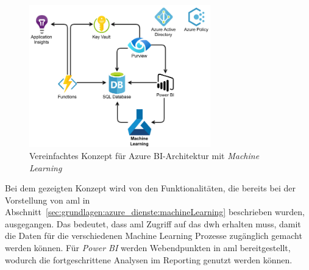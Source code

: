\begin{figure}[htbp]
 \centering
 \includegraphics[width=0.7\textwidth]{gfx/azure/aml.pdf}
 \caption[Vereinfachtes Konzept für Azure BI-Architektur mit Machine Learning]{Vereinfachtes Konzept für Azure BI-Architektur mit \textit{Machine Learning}}
\label{fig:praktischeUmsetzung:ausblick:aml}
\end{figure}

Bei dem gezeigten Konzept wird von den Funktionalitäten, die bereits bei der Vorstellung von \ac{aml} in Abschnitt~\ref{sec:grundlagen:azure_dienste:machineLearning} beschrieben wurden, ausgegangen. Das bedeutet, dass \ac{aml} Zugriff auf das \ac{dwh} erhalten muss, damit die Daten für die verschiedenen Machine Learning Prozesse zugänglich gemacht werden können. Für \textit{Power BI} werden Webendpunkten in \ac{aml} bereitgestellt, wodurch die fortgeschrittene Analysen im Reporting genutzt werden können. \cite[vgl.][]{soh_data_2020}
